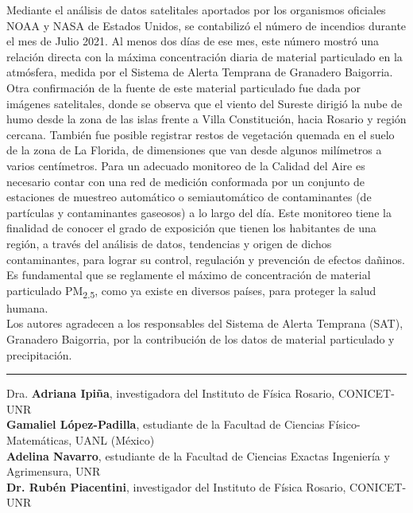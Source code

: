 Mediante el análisis de datos satelitales aportados por los organismos oficiales NOAA y NASA de Estados Unidos, se contabilizó el número de incendios durante el mes de Julio 2021. Al menos dos días de ese mes, este número mostró una relación directa con la máxima concentración diaria de material particulado en la atmósfera, medida por el Sistema de Alerta Temprana de Granadero Baigorria. Otra confirmación de la fuente de este material particulado fue dada por imágenes satelitales, donde se observa que el viento del Sureste dirigió la nube de humo desde la zona de las islas frente a Villa Constitución, hacia Rosario y región cercana. También fue posible registrar restos de vegetación quemada en el suelo de la zona de La Florida, de dimensiones que van desde algunos milímetros a varios centímetros. Para un adecuado monitoreo de la Calidad del Aire es necesario contar con una red de medición conformada por un conjunto de estaciones de muestreo automático o semiautomático de contaminantes (de partículas y contaminantes gaseosos) a lo largo del día. Este monitoreo tiene la finalidad de conocer el grado de exposición que tienen los habitantes de una región, a través del análisis de datos, tendencias y origen de dichos contaminantes, para lograr su control, regulación y prevención de efectos dañinos. Es fundamental que se reglamente el máximo de concentración de material particulado PM\textsubscript{2.5}, como ya existe en diversos países, para proteger la salud humana.\\

Los autores agradecen a los responsables del Sistema de Alerta Temprana (SAT), Granadero Baigorria, por la contribución de los datos de material particulado y precipitación.\vspace{1cm}
\hrule \vspace{0.25cm}
\small
Dra. \textbf{Adriana Ipiña}, investigadora del Instituto de Física Rosario, CONICET-UNR\\

\textbf{Gamaliel López-Padilla}, estudiante de la Facultad de Ciencias Físico-Matemáticas, UANL (México)\\

\textbf{Adelina Navarro}, estudiante de la Facultad de Ciencias Exactas Ingeniería y Agrimensura, UNR\\

\textbf{Dr. Rubén Piacentini}, investigador del Instituto de Física Rosario, CONICET-UNR
